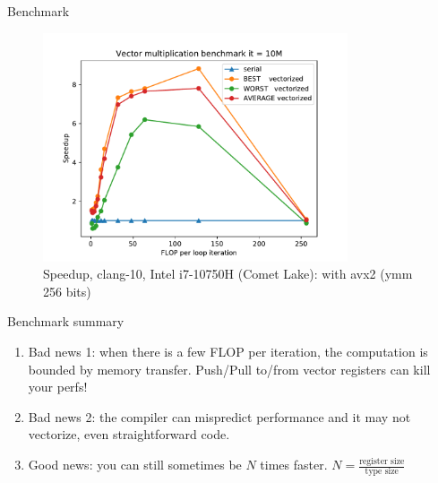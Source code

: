 \documentclass{beamer}
\begin{document}
\begin{frame}{Benchmark}
\begin{figure}
    \includegraphics[width=9cm, center]{clang/speedup_vec_vs_ser_vector_op.pdf}
    \caption{Speedup, clang-10, Intel i7-10750H (Comet Lake): with avx2 (ymm 256 bits)}
    \label{fig:speedup}
\end{figure}
\end{frame}

\begin{frame}{Benchmark summary}
\begin{enumerate}
    \item<1-> Bad news 1: when there is a few FLOP per iteration, the computation is bounded by memory transfer. Push/Pull to/from vector registers can kill your perfs!
    \item<2-> Bad news 2: the compiler can mispredict performance and it may not vectorize, even straightforward code.
    \item<3-> Good news: you can still sometimes be $N$ times faster. $N=\frac{\text{register size}}{\text{type size}}$
\end{enumerate}
\end{frame}
\end{document}
